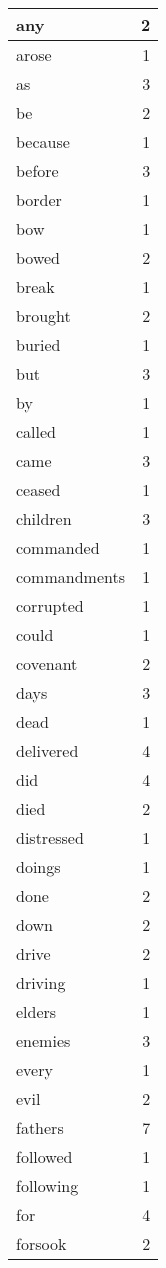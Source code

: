 \begin{center}
\begin{longtable}{l|r}
any & 2 \\ \hline
arose & 1 \\ \hline
as & 3 \\ \hline
be & 2 \\ \hline
because & 1 \\ \hline
before & 3 \\ \hline
border & 1 \\ \hline
bow & 1 \\ \hline
bowed & 2 \\ \hline
break & 1 \\ \hline
brought & 2 \\ \hline
buried & 1 \\ \hline
but & 3 \\ \hline
by & 1 \\ \hline
called & 1 \\ \hline
came & 3 \\ \hline
ceased & 1 \\ \hline
children & 3 \\ \hline
commanded & 1 \\ \hline
commandments & 1 \\ \hline
corrupted & 1 \\ \hline
could & 1 \\ \hline
covenant & 2 \\ \hline
days & 3 \\ \hline
dead & 1 \\ \hline
delivered & 4 \\ \hline
did & 4 \\ \hline
died & 2 \\ \hline
distressed & 1 \\ \hline
doings & 1 \\ \hline
done & 2 \\ \hline
down & 2 \\ \hline
drive & 2 \\ \hline
driving & 1 \\ \hline
elders & 1 \\ \hline
enemies & 3 \\ \hline
every & 1 \\ \hline
evil & 2 \\ \hline
fathers & 7 \\ \hline
followed & 1 \\ \hline
following & 1 \\ \hline
for & 4 \\ \hline
forsook & 2 \\ \hline

\end{longtable}
\end{center}
